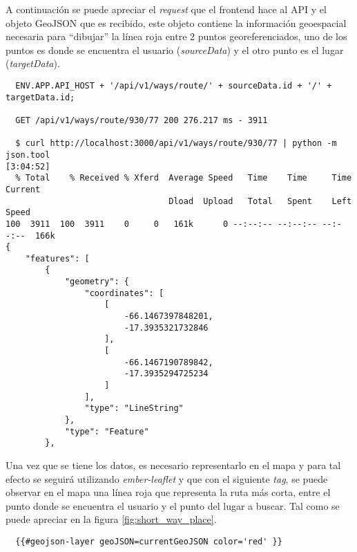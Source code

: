 A continuación se puede apreciar el \emph{request} que el frontend hace al API y  el objeto GeoJSON que es recibido, este objeto contiene la información geoespacial necesaria para ``dibujar'' la línea roja entre 2 puntos georeferenciados, uno de los puntos es donde se encuentra el usuario (\emph{sourceData}) y el otro punto es el lugar (\emph{targetData}).


\begin{verbatim}
  ENV.APP.API_HOST + '/api/v1/ways/route/' + sourceData.id + '/' + targetData.id;

  GET /api/v1/ways/route/930/77 200 276.217 ms - 3911

  $ curl http://localhost:3000/api/v1/ways/route/930/77 | python -m json.tool                                                       [3:04:52]
  % Total    % Received % Xferd  Average Speed   Time    Time     Time  Current
                                 Dload  Upload   Total   Spent    Left  Speed
100  3911  100  3911    0     0   161k      0 --:--:-- --:--:-- --:--:--  166k
{
    "features": [
        {
            "geometry": {
                "coordinates": [
                    [
                        -66.1467397848201,
                        -17.3935321732846
                    ],
                    [
                        -66.1467190789842,
                        -17.3935294725234
                    ]
                ],
                "type": "LineString"
            },
            "type": "Feature"
        },

\end{verbatim}

Una vez que se tiene los datos, es necesario representarlo en el mapa y para tal efecto se seguirá utilizando \emph{ember-leaflet} y que con el siguiente \emph{tag}, se puede observar en el mapa una línea roja que representa la ruta más corta,  entre el punto donde se encuentra el usuario y el punto del lugar a buscar. Tal como se puede apreciar en la figura \ref{fig:short_way_place}.
%
\begin{verbatim}
  {{#geojson-layer geoJSON=currentGeoJSON color='red' }}
\end{verbatim}


